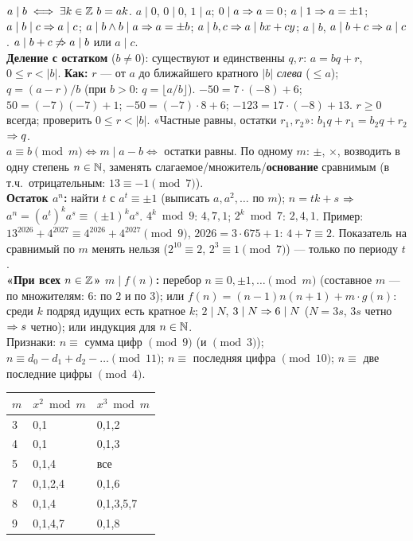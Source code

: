 {
$a\mid b\iff\exists k\in\mathbb{Z}\ b=ak$. $a\mid0$, $0\mid0$, $1\mid a$; $0\mid a\Rightarrow a=0$; $a\mid1\Rightarrow a=\pm1$; $a\mid b\mid c\Rightarrow a\mid c$; $a\mid b\wedge b\mid a\Rightarrow a=\pm b$; $a\mid b,c\Rightarrow a\mid bx+cy$; $a\mid b$, $a\mid b+c\Rightarrow a\mid c$. \trap $a\mid b+c\not\Rightarrow a\mid b$ или $a\mid c$.\\
\textbf{Деление с остатком} ($b\ne0$): существуют и единственны $q,r$: $a=bq+r$, $0\le r<|b|$. \textbf{Как:} $r$ — от $a$ до ближайшего кратного $|b|$ \emph{слева} ($\le a$); $q=(a-r)/b$ (при $b>0$: $q=\lfloor a/b\rfloor$). $-50=7\cdot(-8)+6$; $50=(-7)(-7)+1$; $-50=(-7)\cdot8+6$; $-123=17\cdot(-8)+13$. \trap $r\ge0$ всегда; проверить $0\le r<|b|$. «Частные равны, остатки $r_1,r_2$»: $b_1q+r_1=b_2q+r_2$ $\Rightarrow q$.\\
$a\equiv b\pmod m\iff m\mid a-b\iff$ остатки равны. По одному $m$: $\pm$, $\times$, возводить в одну степень $n\in\mathbb{N}$, заменять слагаемое/множитель/\textbf{основание} сравнимым (в т.ч.\ отрицательным: $13\equiv-1\pmod{7}$).\\
\textbf{Остаток $a^n$:} найти $t$ с $a^t\equiv\pm1$ (выписать $a,a^2,\dots$ по $m$); $n=tk+s$ $\Rightarrow$ $a^n=(a^t)^ka^s\equiv(\pm1)^ka^s$. $4^k\bmod 9$: $4,7,1$; $2^k\bmod7$: $2,4,1$. Пример: $13^{2026}+4^{2027}\equiv4^{2026}+4^{2027}\pmod9$, $2026=3\cdot675+1$: $4+7\equiv2$. \trap Показатель на сравнимый по $m$ менять нельзя ($2^{10}\equiv2$, $2^3\equiv1\pmod7$) — только по периоду $t$.\\
\textbf{«При всех $n\in\mathbb{Z}$» $m\mid f(n)$:} перебор $n\equiv0,\pm1,\dots\pmod m$ (составное $m$ — по множителям: $6$: по $2$ и по $3$); или $f(n)=(n-1)n(n+1)+m\cdot g(n)$: среди $k$ подряд идущих есть кратное $k$; $2\mid N$, $3\mid N\Rightarrow6\mid N$ ($N=3s$, $3s$ четно $\Rightarrow s$ четно); или индукция для $n\in\mathbb{N}$.\\
Признаки: $n\equiv$ сумма цифр $\pmod9$ (и $\pmod 3$); $n\equiv d_0-d_1+d_2-\dots\pmod{11}$; $n\equiv$ последняя цифра $\pmod{10}$; $n\equiv$ две последние цифры $\pmod4$.\\
\begin{tabular}{@{}l|l|l@{}}
$m$&$x^2\bmod m$&$x^3\bmod m$\\\hline
3&0,1&0,1,2\\
4&0,1&0,1,3\\
5&0,1,4&все\\
7&0,1,2,4&0,1,6\\
8&0,1,4&0,1,3,5,7\\
9&0,1,4,7&0,1,8
\end{tabular}
}

